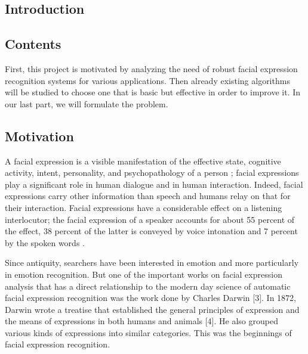 \newpage
  \begin{titlepage}
    \vspace*{\fill}
      \part{Introduction}
    \vspace*{\fill}
  \end{titlepage}

\chapter*{Contents}
First, this project is motivated by analyzing the need of robust facial expression recognition systems for various applications. Then already existing algorithms will be studied to choose one that is basic but effective in order to improve it. In our last part, we will formulate the problem.


\chapter{Motivation}

A facial expression is a visible manifestation of the effective state, cognitive activity, intent, personality, and psychopathology of a person \cite{DON99}; facial expressions play a significant role in human dialogue and in human interaction. Indeed, facial expressions carry other information than speech and humans relay on that for their interaction. Facial expressions have a considerable effect on a listening interlocutor; the facial expression of a speaker accounts for about 55 percent of the effect, 38 percent of the latter is conveyed by voice intonation and 7 percent by the spoken words \cite{PAN00}.

Since antiquity, searchers have been interested in emotion and more particularly in emotion recognition. But one of the important works on facial expression analysis that has a direct relationship to the modern day science of automatic facial expression recognition was the work done by Charles Darwin [3]. In 1872, Darwin wrote a treatise that established the general principles of expression and the means of expressions in both humans and animals [4]. He also grouped various kinds of expressions into similar categories. This was the beginnings of facial expression recognition.

